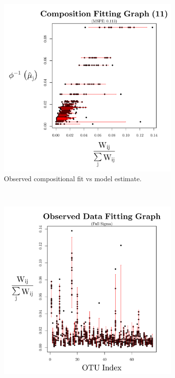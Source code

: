 \documentclass{template}
\begin{document}
\begin{figure}[ht!]
    \centering
    \begin{subfigure}[b]{0.38\textheight}
        \includegraphics[width=\textwidth]{Images/XiaPlotBars11.pdf}
        \caption{Observed compositional fit vs model estimate.}
    \end{subfigure}
\\
    \begin{subfigure}[b]{0.38\textheight}
        \includegraphics[width=\textwidth]{Images/XiaPlotBars11T.pdf}

\end{subfigure}
\end{figure}
\end{document}
